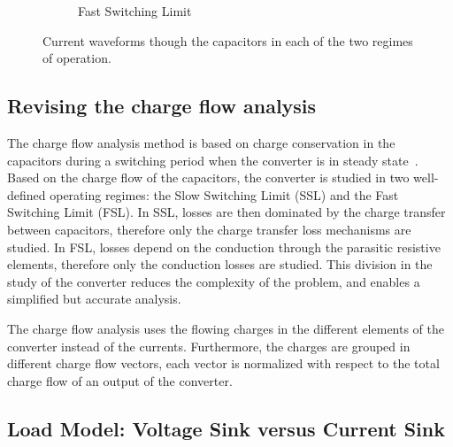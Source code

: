\begin{figure}[!h]
\begin{subfigure}[t]{.45\textwidth}
    \caption{Fast Switching Limit}
    \label{fig:ic_fsl}
\end{subfigure}
\caption{Current waveforms though the capacitors in each of the two regimes of operation. }
\label{fig:capacitor_current}
\end{figure}


\subsection{Revising the charge flow analysis}

The charge flow analysis method is based on charge conservation in the capacitors during a switching period when the converter is in steady state~\cite{95Makowski}. Based on the charge flow of the capacitors, the converter is studied in two well-defined operating regimes: the Slow Switching Limit (SSL) and the Fast Switching Limit (FSL). In SSL, losses are then dominated by the charge transfer between capacitors, therefore only the charge transfer loss mechanisms are studied.  In FSL, losses depend on the conduction through the parasitic resistive elements, therefore only the conduction losses are studied. This division in the study of the converter reduces the complexity of the problem, and enables a simplified but accurate analysis.

The charge flow analysis uses the flowing charges in the different elements of the converter instead of the currents. Furthermore, the charges are grouped in different charge flow vectors, each vector is normalized with respect to the total charge flow of an output of the converter.  


\subsection{Load Model: Voltage Sink versus Current Sink}

